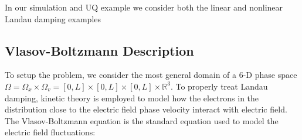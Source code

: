 \documentclass{article}
\begin{document}
\vspace{0.01cm}

In our simulation and UQ example we consider both the linear and nonlinear Landau damping examples\\ 

\vspace{0.01cm}
\subsection{Vlasov-Boltzmann Description}
To setup the problem, we consider the most general domain of a 6-D phase space $\Omega = \Omega_x\times \Omega_v = [0,L]\times[0,L]\times[0,L]\times \mathbb{R}^3$. To properly treat Landau damping, kinetic theory is employed to model how the electrons in the distribution close to the electric field phase velocity interact with electric field. The Vlasov-Boltzmann equation is the standard equation used to model the electric field fluctuations:
\end{document}
